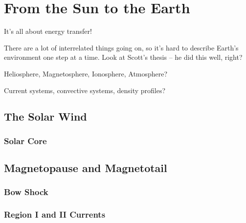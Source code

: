 
\chapter{From the Sun to the Earth}
\label{science_chapter}

It's all about energy transfer! 

There are a lot of interrelated things going on, so it's hard to describe Earth's environment one step at a time. Look at Scott's thesis -- he did this well, right? 

Heliosphere, Magnetosphere, Ionosphere, Atmosphere?

Current systems, convective systems, density profiles? 



\section{The Solar Wind}

\subsection{Solar Core}

\section{Magnetopause and Magnetotail}

\subsection{Bow Shock}

\subsection{Region I and II Currents}


